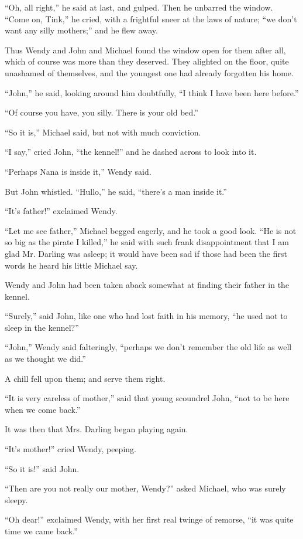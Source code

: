 ``Oh, all right,'' he said at last, and gulped. Then he unbarred the
window. ``Come on, Tink,'' he cried, with a frightful sneer at the laws
of nature; ``we don't want any silly mothers;'' and he flew away.

Thus Wendy and John and Michael found the window open for them after
all, which of course was more than they deserved. They alighted on the
floor, quite unashamed of themselves, and the youngest one had already
forgotten his home.

``John,'' he said, looking around him doubtfully, ``I think I have been
here before.''

``Of course you have, you silly. There is your old bed.''

``So it is,'' Michael said, but not with much conviction.

``I say,'' cried John, ``the kennel!'' and he dashed across to look into
it.

``Perhaps Nana is inside it,'' Wendy said.

But John whistled. ``Hullo,'' he said, ``there's a man inside it.''

``It's father!'' exclaimed Wendy.

``Let me see father,'' Michael begged eagerly, and he took a good look.
``He is not so big as the pirate I killed,'' he said with such frank
disappointment that I am glad Mr. Darling was asleep; it would have
been sad if those had been the first words he heard his little Michael
say.

Wendy and John had been taken aback somewhat at finding their father in
the kennel.

``Surely,'' said John, like one who had lost faith in his memory, ``he
used not to sleep in the kennel?''

``John,'' Wendy said falteringly, ``perhaps we don't remember the old life
as well as we thought we did.''

A chill fell upon them; and serve them right.

``It is very careless of mother,'' said that young scoundrel John, ``not
to be here when we come back.''

It was then that Mrs. Darling began playing again.

``It's mother!'' cried Wendy, peeping.

``So it is!'' said John.

``Then are you not really our mother, Wendy?'' asked Michael, who was
surely sleepy.

``Oh dear!'' exclaimed Wendy, with her first real twinge of remorse, ``it
was quite time we came back.''

